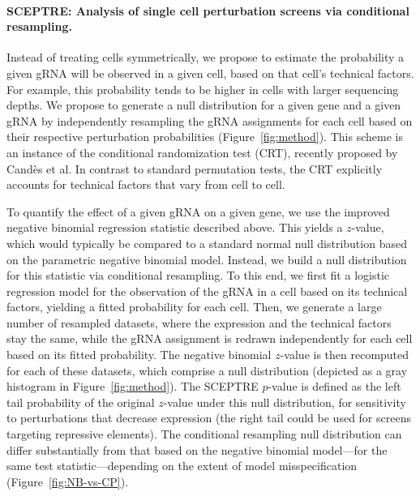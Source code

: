 \documentclass{nature}
\begin{document}
\clearpage
\paragraph{SCEPTRE: Analysis of single cell perturbation screens via conditional resampling.} 

Instead of treating cells symmetrically, we propose to estimate the probability a given gRNA will be observed in a given cell, based on that cell's technical factors. For example, this probability tends to be higher in cells with larger sequencing depths. We propose to generate a null distribution for a given gene and a given gRNA by independently resampling the gRNA assignments for each cell based on their respective perturbation probabilities (Figure~\ref{fig:method}). This scheme is an instance of the conditional randomization test (CRT), recently proposed by Cand\`{e}s et al.\cite{CetL16} In contrast to standard permutation tests, the CRT explicitly accounts for technical factors that vary from cell to cell.

To quantify the effect of a given gRNA on a given gene, we use the improved negative binomial regression statistic described above. This yields a $z$-value, which would typically be compared to a standard normal null distribution based on the parametric negative binomial model. Instead, we build a null distribution for this statistic via conditional resampling. To this end, we first fit a logistic regression model for the observation of the gRNA in a cell based on its technical factors, yielding a fitted probability for each cell. Then, we generate a large number of resampled datasets, where the expression and the technical factors stay the same, while the gRNA assignment is redrawn independently for each cell based on its fitted probability. The negative binomial $z$-value is then recomputed for each of these datasets, which comprise a null distribution (depicted as a gray histogram in Figure~\ref{fig:method}). The SCEPTRE $p$-value is defined as the left tail probability of the original $z$-value under this null distribution, for sensitivity to perturbations that decrease expression (the right tail could be used for screens targeting repressive elements). The conditional resampling null distribution can differ substantially from that based on the negative binomial model---for the same test statistic---depending on the extent of model misspecification (Figure~\ref{fig:NB-vs-CP}).
\end{document}
